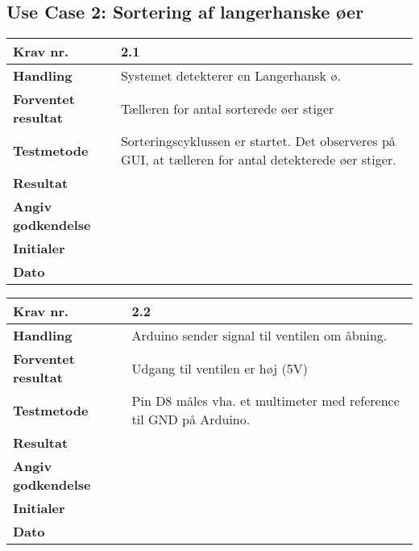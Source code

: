 \newpage
 \subsection{Use Case 2: Sortering af langerhanske øer}

	\begin{center}
		\begin{longtable}{ | m{4cm}| m{8.5cm}|} 
			\hline
			\textbf{Krav nr.} & 2.1  \\ 
			\hline
			\textbf{Handling} & Systemet detekterer en Langerhansk ø.  \\
			\hline
			\textbf{Forventet resultat} & Tælleren for antal sorterede øer stiger \\
			\hline
			\textbf{Testmetode}  & Sorteringscyklussen er startet. Det observeres på GUI, at tælleren for antal detekterede øer stiger.   \\
			\hline
			\textbf{Resultat}  &    \\
			\hline
			\textbf{Angiv godkendelse} &     \\
			\hline
			\textbf{Initialer} &     \\
			\hline
			\textbf{Dato} &    \\
			\hline
		\end{longtable}
	\end{center}	
	
	\begin{center}
		\begin{longtable}{ | m{4cm}| m{8.5cm}|} 
			\hline
			\textbf{Krav nr.} & 2.2  \\ 
			\hline
			\textbf{Handling} & Arduino sender signal til ventilen om åbning.  \\
			\hline
			\textbf{Forventet resultat} & Udgang til ventilen er høj (5V) \\
			\hline
			\textbf{Testmetode}  & Pin D8 måles vha. et multimeter med reference til GND på Arduino.  \\
			\hline
			\textbf{Resultat}  &    \\
			\hline
			\textbf{Angiv godkendelse} &     \\
			\hline
			\textbf{Initialer} &     \\
			\hline
			\textbf{Dato} &    \\
			\hline
		\end{longtable}
	\end{center}	
	
